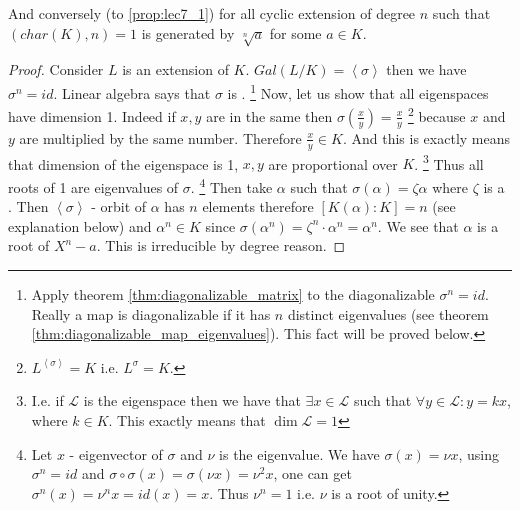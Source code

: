 \begin{proposition}
  And conversely (to \ref{prop:lec7_1}) for all cyclic extension of
  degree $n$ such that $\left(char(K), n\right) = 1$ is generated by
  $\sqrt[n]{a}$ for some $a \in K$.
  \begin{proof}
    Consider $L$ is an extension of $K$.
    $Gal\left(L/K\right) = \left<\sigma\right>$ then we have
    $\sigma^n = id$. Linear algebra says that $\sigma$ is
    .
    \footnote{
      Apply theorem \ref{thm:diagonalizable_matrix} to the
      diagonalizable $\sigma^n = id$. 
      Really a map is diagonalizable if it has $n$ distinct
      eigenvalues (see theorem
      \ref{thm:diagonalizable_map_eigenvalues}). This fact will be
      proved below. 
    }
    Now, let us show that all eigenspaces have dimension 1. Indeed if
    $x,y$ are in the same  then
    $\sigma\left(\frac{x}{y}\right) = \frac{x}{y}$
    \footnote{
      $L^{\left<\sigma\right>} = K$ i.e. $L^{\sigma} = K$.
    }
    because $x$ and $y$
    are multiplied by the same number.
    Therefore $\frac{x}{y} \in
    K$. And this is exactly means that dimension of the eigenspace is
    1, $x,y$ are proportional over $K$.
    \footnote{
      I.e. if $\mathcal{L}$ is the eigenspace then we have that
      $\exists x \in \mathcal{L}$ such that $\forall y \in
      \mathcal{L}: y = k x$, where $k \in K$. This exactly means that
      $\dim \mathcal{L} = 1$
    }
    Thus all roots of 1 are eigenvalues of $\sigma$.
    \footnote{
      Let $x$ - eigenvector of $\sigma$ and $\nu$ is the
      eigenvalue. We have $\sigma\left(x\right) = \nu x$, using
      $\sigma^n = id$ and $\sigma \circ \sigma(x) = \sigma(\nu x) =
      \nu^2 x$, one can get $\sigma^n\left(x\right) = \nu^n x
      = id(x) = x$. Thus $\nu^n = 1$ i.e. $\nu$ is a root of unity.
    }
    Then take
    $\alpha$ such that $\sigma\left(\alpha\right) = \zeta \alpha$
    where $\zeta$ is a . Then
    $\left<\sigma\right>$ - orbit of $\alpha$ has $n$ elements
    therefore $\left[K\left(\alpha\right):K\right] = n$ (see
    explanation below) and $\alpha^n
    \in K$ since $\sigma\left(\alpha^n\right) = \zeta^n \cdot \alpha^n
    = \alpha^n$. We see that $\alpha$ is a root of $X^n - a$. This is
    irreducible by degree reason.


\end{proof}
\end{proposition}
